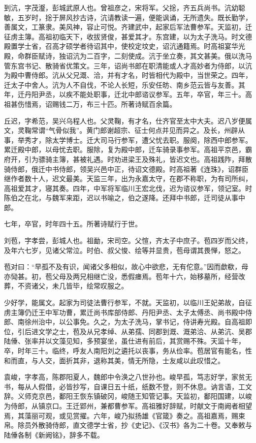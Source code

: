 \documentclass[12pt,UTF8]{ctexbook}
\begin{document}
到沆，字茂瀣，彭城武原人也。曾祖彦之，宋将军。父捴，齐五兵尚书。沆幼聪敏，五岁时，捴于屏风抄古诗，沆请教读一遍，便能讽诵，无所遗失。既长勤学，善属文，工篆隶。美风神，容止可悦。齐建武中，起家后军法曹参军。天监初，迁征虏主簿。高祖初临天下，收拔贤俊，甚爱其才。东宫建，以为太子洗马。时文德殿置学士省，召高才硕学者待诏其中，使校定坟史，诏沆通籍焉。时高祖宴华光殿，命群臣赋诗，独诏沆为二百字，二刻使成。沆于坐立奏，其文甚美。俄以洗马管东宫书记、散骑省优策文。三年，诏尚书郎在职清能或人才高妙者为侍郎，以沆为殿中曹侍郎。沆从父兄溉、洽，并有才名，时皆相代为殿中，当世荣之。四年，迁太子中舍人。沆为人不自伐，不论人长短，乐安任昉、南乡范云皆与友善。其年，迁丹阳尹丞，以疾不能处职事，迁北中郎谘议参军。五年，卒官，年三十。高祖甚伤惜焉，诏赐钱二万，布三十匹。所著诗赋百余篇。

丘迟，字希范，吴兴乌程人也。父灵鞠，有才名，仕齐官至太中大夫。迟八岁便属文，灵鞠常谓“气骨似我”。黄门郎谢超宗、征士何点并见而异之。及长，州辟从事，举秀才，除太学博士。迁大司马行参军，遭父忧去职。服阕，除西中郎参军。累迁殿中郎，以母忧去职。服除，复为殿中郎，迁车骑录事参军。高祖平京邑，霸府开，引为骠骑主簿，甚被礼遇。时劝进梁王及殊礼，皆迟文也。高祖践阼，拜散骑侍郎，俄迁中书侍郎，领吴兴邑中正，待诏文德殿。时高祖著《连珠》，诏群臣继作者数十人，迟文最美。天监三年，出为永嘉太守，在郡不称职，为有司所纠，高祖爱其才，寝其奏。四年，中军将军临川王宏北伐，迟为谘议参军，领记室。时陈伯之在北，与魏军来距，迟以书喻之，伯之遂降。还拜中书郎，迁司徒从事中郎。

七年，卒官，时年四十五。所著诗赋行于世。

刘苞，字孝尝，彭城人也。祖勔，宋司空。父愃，齐太子中庶子。苞四岁而父终，及年六七岁，见诸父常泣。时伯、叔父悛、绘等并显贵，苞母谓其畏惮，怒之。

苞对曰：“早孤不及有识，闻诸父多相似，故心中欲悲，无有佗意。”因而歔欷，母亦恸甚。初，苞父母及两兄相继亡没，悉假瘗焉。苞年十六，始移墓所，经营改葬，不资诸父，未几皆毕，绘常叹服之。

少好学，能属文。起家为司徒法曹行参军，不就。天监初，以临川王妃弟故，自征虏主簿仍迁王中军功曹，累迁尚书库部侍郎、丹阳尹丞、太子太傅丞、尚书殿中侍郎、南徐州治中，以公事免。久之，为太子洗马，掌书记，侍讲寿光殿。自高祖即位，引后进文学之士，苞及从兄孝绰、从弟孺、同郡到溉、溉弟洽、从弟沆、吴郡陆倕、张率并以文藻见知，多预宴坐，虽仕进有前后，其赏赐不殊。天监十年，卒，时年三十。临终，呼友人南阳刘之遴托以丧事，务从俭率。苞居官有能名，性和而直，与人交，面折其非，退称其美，情无所隐，士友咸以此叹惜之。

袁峻，字孝高，陈郡阳夏人，魏郎中令涣之八世孙也。峻早孤，笃志好学，家贫无书，每从人假借，必皆抄写，自课日五十纸，纸数不登，则不休息。讷言语，工文辞。义师克京邑，鄱阳王恢东镇破冈，峻随王知管记事。天监初，鄱阳国建，以峻为侍郎，从镇京口。王迁郢州，兼都曹参军。高祖雅好辞赋，时献文于南阙者相望焉，其藻丽可观，或见赏擢。六年，峻乃拟扬雄《官箴》奏之。高祖嘉焉，赐束帛。除员外散骑侍郎，直文德学士省，抄《史记》、《汉书》各为二十卷。又奉敕与陆倕各制《新阙铭》，辞多不载。
\end{document}
